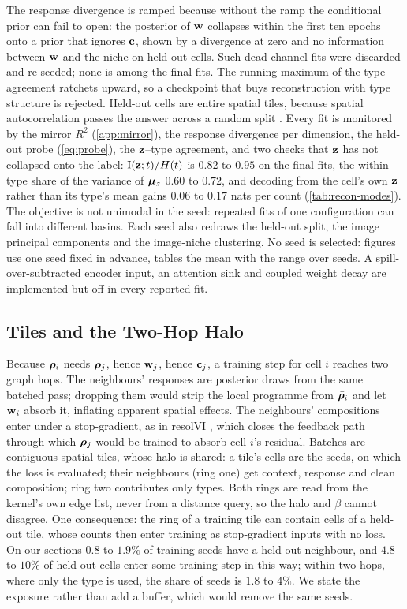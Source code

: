 The response divergence is ramped because without the ramp the conditional prior can fail to open: the posterior of $\mathbf{w}$ collapses within the first ten epochs onto a prior that ignores $\mathbf{c}$, shown by a divergence at zero and no information between $\mathbf{w}$ and the niche on held-out cells. Such dead-channel fits were discarded and re-seeded; none is among the final fits. The running maximum of the type agreement ratchets upward, so a checkpoint that buys reconstruction with type structure is rejected. Held-out cells are entire spatial tiles, because spatial autocorrelation passes the answer across a random split \citep{roberts2017}. Every fit is monitored by the mirror $R^2$ (\cref{app:mirror}), the response divergence per dimension, the held-out probe (\cref{eq:probe}), the $\mathbf{z}$--type agreement, and two checks that $\mathbf{z}$ has not collapsed onto the label: $\operatorname{I}(\mathbf{z};t)/H(t)$ is $0.82$ to $0.95$ on the final fits, the within-type share of the variance of $\boldsymbol{\mu}_z$ $0.60$ to $0.72$, and decoding from the cell's own $\mathbf{z}$ rather than its type's mean gains $0.06$ to $0.17$ nats per count (\cref{tab:recon-modes}). The objective is not unimodal in the seed: repeated fits of one configuration can fall into different basins. Each seed also redraws the held-out split, the image principal components and the image-niche clustering. No seed is selected: figures use one seed fixed in advance, tables the mean with the range over seeds. A spill-over-subtracted encoder input, an attention sink and coupled weight decay are implemented but off in every reported fit.

\subsection{Tiles and the Two-Hop Halo}
\label{app:tiles}

Because $\bar{\boldsymbol{\rho}}_i$ needs $\boldsymbol{\rho}_j$, hence $\mathbf{w}_j$, hence $\mathbf{c}_j$, a training step for cell $i$ reaches two graph hops. The neighbours' responses are posterior draws from the same batched pass; dropping them would strip the local programme from $\bar{\boldsymbol{\rho}}_i$ and let $\mathbf{w}_i$ absorb it, inflating apparent spatial effects. The neighbours' compositions enter under a stop-gradient, as in resolVI \citep{ergen2026resolvi}, which closes the feedback path through which $\boldsymbol{\rho}_j$ would be trained to absorb cell $i$'s residual. Batches are contiguous spatial tiles, whose halo is shared: a tile's cells are the seeds, on which the loss is evaluated; their neighbours (ring one) get context, response and clean composition; ring two contributes only types. Both rings are read from the kernel's own edge list, never from a distance query, so the halo and $\beta$ cannot disagree. One consequence: the ring of a training tile can contain cells of a held-out tile, whose counts then enter training as stop-gradient inputs with no loss. On our sections $0.8$ to $1.9\%$ of training seeds have a held-out neighbour, and $4.8$ to $10\%$ of held-out cells enter some training step in this way; within two hops, where only the type is used, the share of seeds is $1.8$ to $4\%$. We state the exposure rather than add a buffer, which would remove the same seeds.
